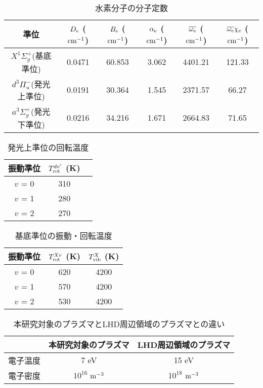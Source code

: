 \listoftables
{}

\begin{table}
    \caption{水素分子の分子定数\cite{nist}}
    \label{table:molecular-constants}
    \centering
    \begin{tabular}{cccccc}
        \hline
        準位 & $D_{\rm e}$ ($\rm cm^{-1}$)& $B_{\rm e}$ ($\rm cm^{-1}$)& $\alpha_{\rm e}$ ($\rm cm^{-1}$)& $\overline{\omega_{\rm e}}$ ($\rm cm^{-1}$)& $\overline{\omega_{\rm e}} \chi_{\rm e}$ ($\rm cm^{-1}$)\\
        \hline
        $X^1 \Sigma^+_g$(基底準位) & 0.0471 & 60.853 & 3.062 & 4401.21 & 121.33\\
        $d^3 \Pi^-_u$(発光上準位) & 0.0191 & 30.364 & 1.545 & 2371.57 & 66.27\\
        $a^3 \Sigma^+_g$(発光下準位) & 0.0216 & 34.216 & 1.671 & 2664.83 & 71.65\\
        \hline
    \end{tabular}
\end{table}

\begin{table}
    \caption{発光上準位の回転温度}
    \label{table:upper-temperatures}
    \centering
    \begin{tabular}{ccc}
        \hline
        振動準位 & $T^{dv'}_{\rm rot}$ (K)\\
        \hline
        $v$ = 0 & 310\\
        $v$ = 1 & 280\\
        $v$ = 2 & 270\\
        \hline
    \end{tabular}
\end{table}

\begin{table}
    \caption{基底準位の振動・回転温度}
    \label{table:fitting-result}
    \centering
    \begin{tabular}{ccc}
        \hline
        振動準位 & $T^{Xv}_{\rm rot}$ (K) & $T^{X}_{\rm vib}$ (K)\\
        \hline
        $v$ = 0 & 620 & 4200\\
        $v$ = 1 & 570 & 4200\\
        $v$ = 2 & 530 & 4200\\
        \hline
    \end{tabular}
\end{table}

\begin{table}
    \caption{本研究対象のプラズマとLHD周辺領域のプラズマとの違い}
    \label{table:LHD-and-this-plasma}
    \centering
    \begin{tabular}{ccc}
        \hline
         & 本研究対象のプラズマ & LHD周辺領域のプラズマ\\
        \hline
        電子温度 & 7 eV & 15 eV\\
        電子密度 & $10^{16}$ $\rm m^{-3}$ & $10^{18}$ $\rm m^{-3}$\\
        \hline
    \end{tabular}
\end{table}


